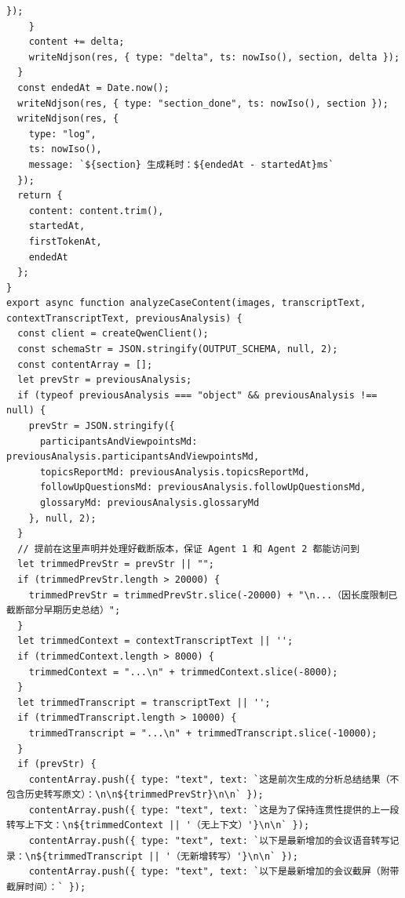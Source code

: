 \documentclass[12pt,a4paper]{article}
\begin{document}
\begin{Verbatim}[fontsize=\footnotesize]
      });
    }
    content += delta;
    writeNdjson(res, { type: "delta", ts: nowIso(), section, delta });
  }
  const endedAt = Date.now();
  writeNdjson(res, { type: "section_done", ts: nowIso(), section });
  writeNdjson(res, {
    type: "log",
    ts: nowIso(),
    message: `${section} 生成耗时：${endedAt - startedAt}ms`
  });
  return {
    content: content.trim(),
    startedAt,
    firstTokenAt,
    endedAt
  };
}
export async function analyzeCaseContent(images, transcriptText, contextTranscriptText, previousAnalysis) {
  const client = createQwenClient();
  const schemaStr = JSON.stringify(OUTPUT_SCHEMA, null, 2);
  const contentArray = [];
  let prevStr = previousAnalysis;
  if (typeof previousAnalysis === "object" && previousAnalysis !== null) {
    prevStr = JSON.stringify({
      participantsAndViewpointsMd: previousAnalysis.participantsAndViewpointsMd,
      topicsReportMd: previousAnalysis.topicsReportMd,
      followUpQuestionsMd: previousAnalysis.followUpQuestionsMd,
      glossaryMd: previousAnalysis.glossaryMd
    }, null, 2);
  }
  // 提前在这里声明并处理好截断版本，保证 Agent 1 和 Agent 2 都能访问到
  let trimmedPrevStr = prevStr || "";
  if (trimmedPrevStr.length > 20000) {
    trimmedPrevStr = trimmedPrevStr.slice(-20000) + "\n...（因长度限制已截断部分早期历史总结）";
  }
  let trimmedContext = contextTranscriptText || '';
  if (trimmedContext.length > 8000) {
    trimmedContext = "...\n" + trimmedContext.slice(-8000);
  }
  let trimmedTranscript = transcriptText || '';
  if (trimmedTranscript.length > 10000) {
    trimmedTranscript = "...\n" + trimmedTranscript.slice(-10000);
  }
  if (prevStr) {
    contentArray.push({ type: "text", text: `这是前次生成的分析总结结果（不包含历史转写原文）：\n\n${trimmedPrevStr}\n\n` });
    contentArray.push({ type: "text", text: `这是为了保持连贯性提供的上一段转写上下文：\n${trimmedContext || '（无上下文）'}\n\n` });
    contentArray.push({ type: "text", text: `以下是最新增加的会议语音转写记录：\n${trimmedTranscript || '（无新增转写）'}\n\n` });
    contentArray.push({ type: "text", text: `以下是最新增加的会议截屏（附带截屏时间）：` });
\end{Verbatim}
\newpage
{}
\fancyhead[R]{}
\end{document}
